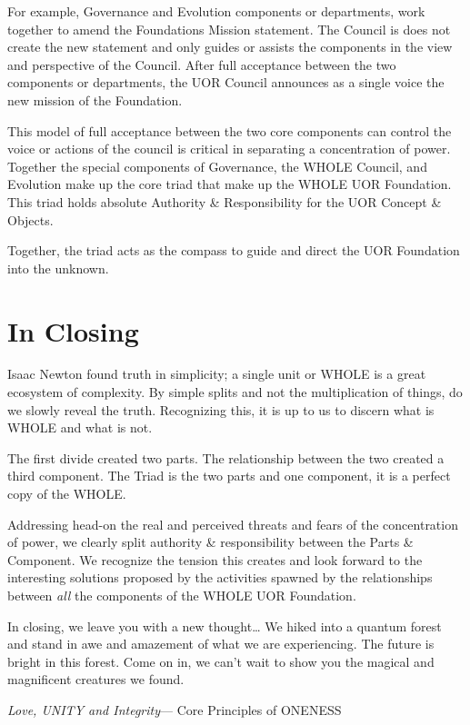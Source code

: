 \documentclass[twocolumn,10pt]{article}
\renewcommand{\textflush}{flushleft}     %
\renewcommand{\sourceflush}{flushright}  %
\renewcommand{\epigraphsize}{\itshape} %
\begin{document}
For example, Governance and Evolution components or departments, work together to amend the Foundations Mission statement.
The Council is does not create the new statement and only guides or assists the components in the view and perspective of the Council.
After full acceptance between the two components or departments, the UOR Council announces as a single voice the new mission of the Foundation.

This model of full acceptance between the two core components can control the voice or actions of the council is critical in separating a concentration of power.
Together the special components of Governance, the WHOLE Council, and Evolution make up the core triad that make up the WHOLE UOR Foundation.
This triad holds absolute Authority \& Responsibility for the UOR Concept \& Objects.

Together, the triad acts as the compass to guide and direct the UOR Foundation into the unknown.

\section*{In Closing}
Isaac Newton found truth in simplicity; a single unit or WHOLE is a great ecosystem of complexity.
By simple splits and not the multiplication of things, do we slowly reveal the truth.
Recognizing this, it is up to us to discern what is WHOLE and what is not.

The first divide created two parts.
The relationship between the two created a third component.
The Triad is the two parts and one component, it is a perfect copy of the WHOLE\@.

Addressing head-on the real and perceived threats and fears of the concentration of power, we clearly split authority \& responsibility between the Parts \& Component. 
We recognize the tension this creates and look forward to the interesting solutions proposed by the activities spawned by the relationships between \textit{all} the components of the WHOLE UOR Foundation.

In closing, we leave you with a new thought\ldots
We hiked into a quantum forest and stand in awe and amazement of what we are experiencing.
The future is bright in this forest.
Come on in, we can't wait to show you the magical and magnificent creatures we found.
\vspace{10pt}

\setlength{\epigraphwidth}{0.95\textwidth} %
\renewcommand{\textflush}{flushleft}     %
\renewcommand{\sourceflush}{flushright}  %
\renewcommand{\epigraphsize}{\itshape} %


\emph{Love, UNITY and Integrity}{--- Core Principles of ONENESS}
\end{document}
